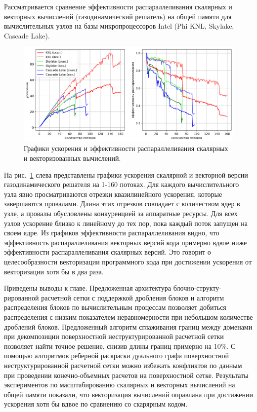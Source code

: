 \documentclass[a4paper,14pt]{extarticle}                     %
\theoremstyle{plain}                                         %
\begin{document}
Рассматривается сравнение эффективности распараллеливания скалярных и векторных вычислений (газодинамический решатель) на общей памяти для вычислительных узлов на базы микропроцессоров Intel (Phi KNL, Skylake, Cascade Lake).

\begin{figure}[ht]
\centering
\includegraphics[width=1.0\textwidth]{./fig/par_openmp_scalar_vec_chart.png}
\singlespacing
\caption{Графики ускорения и эффективности распараллеливания скалярных и векторизованных вычислений.}
\label{fig:text_3_omp2}
\end{figure}

На рис.~\ref{fig:text_3_omp2} слева представлены графики ускорения скалярной и векторной версии газодинамического решателя на 1-160 потоках.
Для каждого вычислительного узла явно просматриваются отрезки квазилинейного ускорения, которые завершаются провалами.
Длина этих отрезков совпадает с количеством ядер в узле, а провалы обусловлены конкуренцией за аппаратные ресурсы.
Для всех узлов ускорение близко к линейному до тех пор, пока каждый поток запущен на своем ядре.
Из графиков эффективности распараллеливания видно, что эффективность распараллеливания векторных версий кода примерно вдвое ниже эффективности распараллеливания скалярных версий.
Это говорит о целесообразности векторизации программного кода при достижении ускорения от векторизации хотя бы в два раза.


Приведены выводы к главе.
Предложенная архитектура блочно-структу-рированной расчетной сетки с поддержкой дробления блоков и алгоритм распределения блоков по вычислительным процессам позволяет добиться распределения с низким показателем неравномерности при небольшом количестве дроблений блоков.
Предложенный алгоритм сглаживания границ между доменами при декомпозиции поверхностной неструктурированной расчетной сетки позволяет найти точное решение, снизив длины границ примерно на 10\%.
С помощью алгоритмов реберной раскраски дуального графа поверхностной неструктурированной расчетной сетки можно избежать конфликтов по данным при проведении конечно-объемных расчетов на поверхностной сетке.
Результаты экспериментов по масштабированию скалярных и векторных вычислений на общей памяти показали, что векторизация вычислений оправлана при достижении ускорения хотя бы вдвое по сравнению со скарярным кодом.
\end{document}
